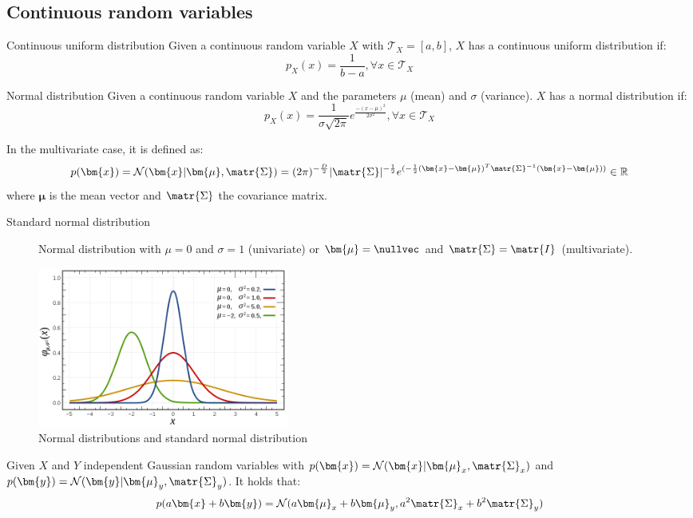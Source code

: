 \subsection{Continuous random variables}
\begin{descriptionlist}
    \item[Continuous uniform distribution] 
        Given a continuous random variable $X$ with $\mathcal{T}_X = [a, b]$,
        $X$ has a continuous uniform distribution if:
        \[ p_X(x) = \frac{1}{b-a}, \forall x \in \mathcal{T}_X \]
    
    \item[Normal distribution] 
        Given a continuous random variable $X$ and the parameters $\mu$ (mean) and $\sigma$ (variance).
        $X$ has a normal distribution if:
        \[ p_X(x) = \frac{1}{\sigma \sqrt{2\pi}} e^{\frac{-(x-\mu)^2}{2\sigma^2}} , \forall x \in \mathcal{T}_X\]

        In the multivariate case, it is defined as:
        \[ 
            p(\bm{x}) = \mathcal{N}(\bm{x} \vert \bm{\mu}, \matr{\Sigma}) = 
                (2\pi)^{-\frac{D}{2}} \vert \matr{\Sigma} \vert^{-\frac{1}{2}} e^{(-\frac{1}{2}(\bm{x} - \bm{\mu})^T\matr{\Sigma}^{-1}(\bm{x}-\bm{\mu}))}
                \in \mathbb{R}
        \]
        where $\bm{\mu}$ is the mean vector and  $\matr{\Sigma}$ the covariance matrix.

        \begin{description}
            \item[Standard normal distribution] 
                Normal distribution with $\mu = 0$ and $\sigma = 1$ (univariate) or 
                $\bm{\mu} = \nullvec$ and $\matr{\Sigma} = \matr{I}$ (multivariate).
        \end{description}

        \begin{figure}[H]
            \centering
            \includegraphics[width=0.40\textwidth]{img/normal_distribution.png}
            \caption{Normal distributions and standard normal distribution}
        \end{figure}


        \begin{theorem}[Linearity]
            Given $X$ and $Y$ independent Gaussian random variables with
            $p(\bm{x}) = \mathcal{N}(\bm{x} \vert \bm{\mu}_x, \matr{\Sigma}_x)$ and
            $p(\bm{y}) = \mathcal{N}(\bm{y} \vert \bm{\mu}_y, \matr{\Sigma}_y)$.
            It holds that:
            \[ p(a\bm{x} + b\bm{y}) = \mathcal{N}(a\bm{\mu}_x + b\bm{\mu}_y, a^2\matr{\Sigma}_x + b^2\matr{\Sigma}_y) \]
        \end{theorem}
\end{descriptionlist}